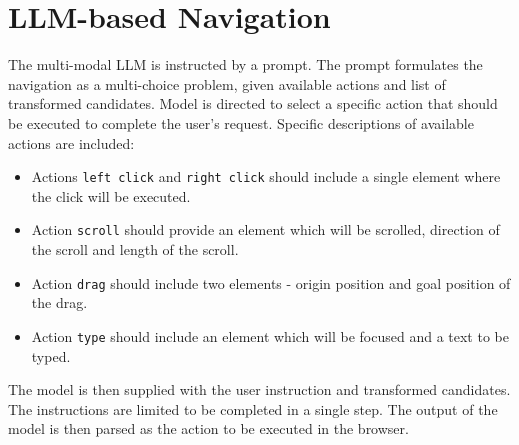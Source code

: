\section{LLM-based Navigation}\label{section:navigation}
The multi-modal LLM is instructed by a prompt. The prompt formulates the navigation as a multi-choice problem, given available actions and list of transformed candidates. Model is directed to select a specific action that should be executed to complete the user's request. Specific descriptions of available actions are included:
\begin{itemize}
    \item Actions \texttt{left click} and \texttt{right click} should include a single element where the click will be executed.
    \item Action \texttt{scroll} should provide an element which will be scrolled, direction of the scroll and length of the scroll.
    \item Action \texttt{drag} should include two elements - origin position and goal position of the drag.
    \item Action \texttt{type} should include an element which will be focused and a text to be typed.
\end{itemize}

The model is then supplied with the user instruction and transformed candidates. The instructions are limited to be completed in a single step. The output of the model is then parsed as the action to be executed in the browser.

